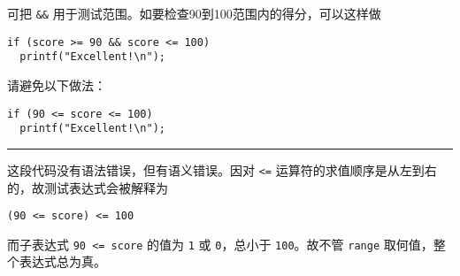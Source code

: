 \begin{frame}[fragile]
可把 \lstinline|&&| 用于测试范围。如要检查90到100范围内的得分，可以这样做
\begin{lstlisting}
if (score >= 90 && score <= 100)
  printf("Excellent!\n");
\end{lstlisting} 
\end{frame}

\begin{frame}[fragile]
请避免以下做法：
\begin{lstlisting}
if (90 <= score <= 100)
  printf("Excellent!\n");
\end{lstlisting}

\rule{\textwidth}{.5mm} \pause \vspace{0.5mm}

这段代码没有语法错误，但有语义错误。因对 \lstinline|<=| 运算符的求值顺序是从左到右的，故测试表达式会被解释为
\begin{lstlisting}
(90 <= score) <= 100
\end{lstlisting}
而子表达式 \lstinline|90 <= score| 的值为 \lstinline|1| 或 \lstinline|0|，总小于 \lstinline|100|。故不管 \lstinline|range| 取何值，整个表达式总为真。
\end{frame}

